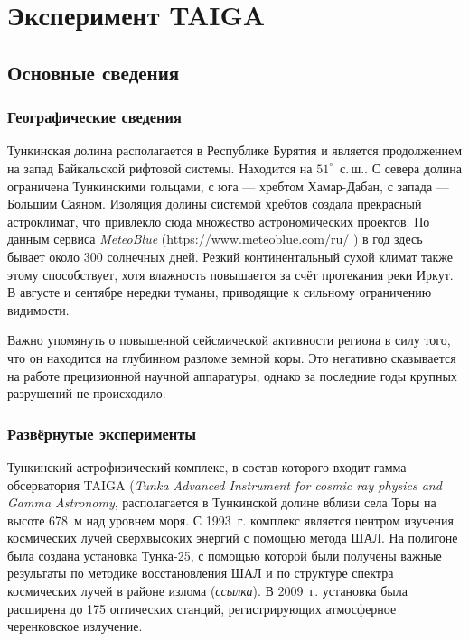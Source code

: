 \documentclass[magd,floatypics,numeref]{msudipl} %
\begin{document}
\chapter{Эксперимент TAIGA}
\section{Основные сведения}
\subsection{Географические сведения}
Тункинская долина располагается в Республике Бурятия и является продолжением на запад Байкальской рифтовой системы.  Находится на $51^{\circ}$~с.\,ш.. С севера долина ограничена Тункинскими гольцами, с юга --- хребтом Хамар-Дабан, с запада --- Большим Саяном. Изоляция долины системой хребтов создала прекрасный астроклимат, что привлекло сюда множество астрономических проектов. По данным сервиса \textit{MeteoBlue} (https://www.meteoblue.com/ru/%
)
в год здесь бывает около 300 солнечных дней. Резкий континентальный сухой климат также этому способствует, хотя влажность повышается за счёт протекания реки Иркут. В августе и сентябре нередки туманы, приводящие к сильному ограничению видимости. 

Важно упомянуть о повышенной сейсмической активности региона в силу того, что он находится на глубинном разломе земной коры. Это негативно сказывается на работе прецизионной научной аппаратуры, однако за последние годы крупных разрушений не происходило.
\subsection{Развёрнутые эксперименты}
Тункинский астрофизический комплекс, в состав которого входит гамма-обсерватория TAIGA (\textit{Tunka Advanced Instrument for cosmic ray physics and Gamma Astronomy}, располагается в Тункинской долине вблизи села Торы на высоте 678~м над уровнем моря. С 1993~г. комплекс является центром изучения космических лучей сверхвысоких энергий с помощью метода ШАЛ. На полигоне была создана установка Тунка-25, с помощью которой были получены важные результаты по методике восстановления ШАЛ и по структуре спектра космических лучей в районе излома (\textit{ссылка}). В 2009~г. установка была расширена до 175 оптических станций, регистрирующих атмосферное черенковское излучение. 
\end{document}

